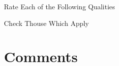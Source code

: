 \documentclass[english,pdf,pagemark,stamp]{sdaps}
\begin{document}
\begin{questionnaire}[noinfo]
\begin{multicols}{2}
\begin{markgroup}{Rate Each of the Following Qualities}
    \end{markgroup}

\columnbreak

  \begin{choicequestion}[1]{Check Thouse Which Apply}
  \end{choicequestion}
\vspace{1 mm}

\end{multicols}

    \section{Comments}


  \end{questionnaire}
\end{document}
